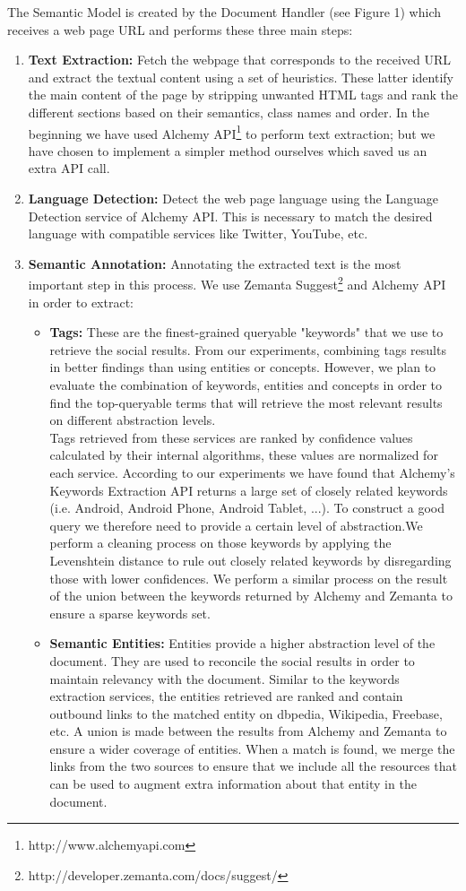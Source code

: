 \documentclass[oribibl]{llncs}
\begin{document}
The Semantic Model is created by the Document Handler (see Figure 1) which receives a web page URL and performs these three main steps:
\begin{enumerate}
\item {\bf Text Extraction:} Fetch the webpage that corresponds to the received URL and extract the textual content using a set of heuristics. These latter identify the main content of the page by stripping unwanted HTML tags and rank the different sections based on their semantics, class names and order. In the beginning we have used Alchemy API\footnote{http://www.alchemyapi.com} to perform text extraction; but we have chosen to implement a simpler method ourselves which saved us an extra API call. 
\item {\bf Language Detection:} Detect the web page language using the Language Detection service of Alchemy API. This is necessary to match the desired language with compatible services like Twitter, YouTube, etc.
\item {\bf Semantic Annotation:} Annotating the extracted text is the most important step in this process. We use Zemanta Suggest\footnote{http://developer.zemanta.com/docs/suggest/} and Alchemy API in order to extract: 
\begin{itemize}
\item {\bf Tags:} These are the finest-grained queryable "keywords" that we use to retrieve the social results. From our experiments, combining tags results in better findings than using entities or concepts. However, we plan to evaluate the combination of keywords, entities and concepts in order to find the top-queryable terms that will retrieve the most relevant results on different abstraction levels.
\\Tags retrieved from these services are ranked by confidence values calculated by their internal algorithms, these values are normalized for each service. According to our experiments we have found that Alchemy's Keywords Extraction API returns a large set of closely related keywords (i.e. Android, Android Phone, Android Tablet, ...). To construct a good query we therefore need to provide a certain level of abstraction.We perform a cleaning process on those keywords by applying the Levenshtein distance to rule out closely related keywords by disregarding those with lower confidences. We perform a similar process on the result of the union between the keywords returned by Alchemy and Zemanta to ensure a sparse keywords set.
\item {\bf Semantic Entities:} Entities provide a higher abstraction level of the document. They are used to reconcile the social results in order to maintain relevancy with the document. Similar to the keywords extraction services, the entities retrieved are ranked and contain outbound links to the matched entity on dbpedia, Wikipedia, Freebase, etc. A union is made between the results from Alchemy and Zemanta to ensure a wider coverage of entities. When a match is found, we merge the links from the two sources to ensure that we include all the resources that can be used to augment extra information about that entity in the document. 

\end{itemize}
\end{enumerate}
\end{document}
